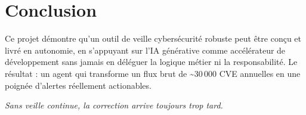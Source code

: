 \documentclass[11pt,a4paper]{article}
\begin{document}
\section{Conclusion}

Ce projet démontre qu'un outil de veille cybersécurité robuste peut être conçu et livré en autonomie, en s'appuyant sur l'IA générative comme accélérateur de développement sans jamais en déléguer la logique métier ni la responsabilité. Le résultat : un agent qui transforme un flux brut de \hbox{\textasciitilde}30\,000 CVE annuelles en une poignée d'alertes réellement actionables.

\vspace{0.5cm}
\begin{center}
{\sffamily\itshape\color{midgray}\large
\og Sans veille continue, la correction arrive toujours trop tard. \fg{}}
\end{center}
\end{document}
